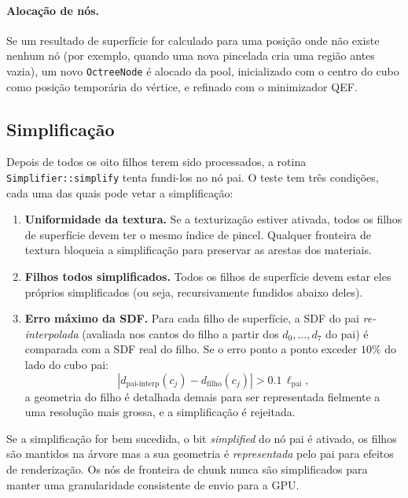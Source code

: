 \documentclass[10pt,a4paper]{article}
\begin{document}
\paragraph{Alocação de nós.}
Se um resultado de superfície for calculado para uma posição onde não
existe nenhum nó (por exemplo, quando uma nova pincelada cria uma
região antes vazia), um novo \lstinline{OctreeNode} é alocado da
pool, inicializado com o centro do cubo como posição temporária do
vértice, e refinado com o minimizador QEF.

\subsection{Simplificação}
\label{sec:shape:simplify}

Depois de todos os oito filhos terem sido processados, a rotina
\lstinline{Simplifier::simplify} tenta fundi-los no nó pai. O teste
tem três condições, cada uma das quais pode vetar a simplificação:

\begin{enumerate}
  \item \textbf{Uniformidade da textura.} Se a texturização estiver
    ativada, todos os filhos de superfície devem ter o mesmo índice
    de pincel. Qualquer fronteira de textura bloqueia a simplificação
    para preservar as arestas dos materiais.
  \item \textbf{Filhos todos simplificados.} Todos os filhos de
    superfície devem estar eles próprios simplificados (ou seja,
    recursivamente fundidos abaixo deles).
  \item \textbf{Erro máximo da SDF.} Para cada filho de superfície,
    a SDF do pai \emph{re-interpolada} (avaliada nos cantos do filho
    a partir dos $d_0,\ldots,d_7$ do pai) é comparada com a SDF real
    do filho. Se o erro ponto a ponto exceder $10\%$ do lado do cubo
    pai:
    \[
      |d_{\text{pai-interp}}(c_j) - d_{\text{filho}}(c_j)| >
        0.1\,\ell_{\text{pai}},
    \]
    a geometria do filho é detalhada demais para ser representada
    fielmente a uma resolução mais grossa, e a simplificação é
    rejeitada.
\end{enumerate}

\noindent
Se a simplificação for bem sucedida, o bit \emph{simplified} do nó
pai é ativado, os filhos são mantidos na árvore mas a sua geometria
é \emph{representada} pelo pai para efeitos de renderização. Os nós
de fronteira de chunk nunca são simplificados para manter uma
granularidade consistente de envio para a GPU.
\end{document}

